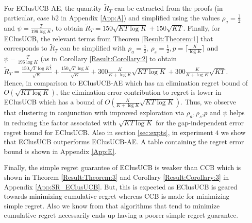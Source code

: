 For EClusUCB-AE, the quantity $\widetilde R_T$ can be extracted from the proofs (in particular, case b2 in Appendix \ref{App:A}) and simplified using the values $\rho_{a}=\frac{1}{2}$ and $\psi=\frac{T}{196 \log K}$, to obtain $\widetilde R_T = 150\sqrt{KT\log K}+150\sqrt{KT}$. 
Finally, for EClusUCB, the relevant terms from Theorem \ref{Result:Theorem:1} that corresponds to $\widetilde R_T$ can be simplified with $\rho_{a}=\frac{1}{2}$, $\rho_{s}=\frac{1}{2},p=\big\lceil \frac{K}{\log K} \big\rceil$ and $\psi=\frac{T}{196\log K}$ (as in Corollary \ref{Result:Corollary:2} to obtain  
$\tilde R_T = \frac{150 \sqrt{T}\log K^{\frac{3}{2}} }{\sqrt{K}} + \frac{150 \sqrt{T}\log K}{\sqrt{K}} + 300 \frac{K}{K+\log K}\sqrt{KT\log K} + 300 \frac{K}{K+\log K}\sqrt{KT}$. Hence, in comparison to EClusUCB-AE which has an elimination regret bound of $O(\sqrt{KT\log K})$, the elimination error contribution to regret is lower in EClusUCB which has a bound of $O(\frac{K}{K+\log K}\sqrt{KT\log K})$. Thus, we observe that clustering in conjunction with improved exploration via $\rho_{a},\rho_{s}$,$p$ and $\psi$ helps in reducing the factor associated with $\sqrt{KT\log K}$ for the gap-independent error regret bound for EClusUCB. Also in section \ref{sec:expts}, in experiment $4$ we show that EClusUCB outperforms EClusUCB-AE. A table containing the regret error bound is shown in Appendix \ref{App:E}.

Finally, the simple regret guarantee of EClusUCB is weaker than CCB\cite{liu2016modification} which is shown in Theorem \ref{Result:Theorem:3} and Corollary \ref{Result:Corollary:3} in Appendix \ref{App:SR_EClusUCB}. But, this is expected as EClusUCB is geared towards minimizing cumulative regret whereas CCB is made for minimizing simple regret. Also we know from \citet{bubeck2009pure} that algorithms that tend to minimize cumulative regret necessarily ends up having a poorer simple regret guarantee. 

